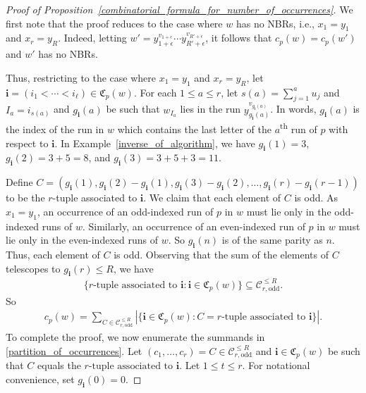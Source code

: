 \documentclass[11pt]{amsart}
\begin{document}
\begin{proof}[Proof of Proposition~\ref{combinatorial_formula_for_number_of_occurrences}]
    We first note that the proof reduces to the case where $w$ has no NBRs, i.e., $x_1=y_1$ and $x_r=y_R$. Indeed, letting $w'=y_{1+\epsilon}^{v_{1+\epsilon}}\cdots y_{R'+\epsilon}^{v_{R'+\epsilon}}$, it follows that $c_p(w)=c_p(w')$ and $w'$ has no NBRs.
    
    Thus, restricting to the case where $x_1=y_1$ and $x_r=y_R$, let $\mathbf{i}=(i_1<\cdots<i_{\ell})\in\mathfrak{C}_p(w)$. For each $1\leq a\leq r$, let $s(a)=\sum_{j=1}^{a}u_j$ and $I_a=i_{s(a)}$ and $g_{\mathbf{i}}(a)$ be such that $w_{I_a}$ lies in the run $y_{g_{\mathbf{i}}(a)}^{v_{g_{\mathbf{i}}(a)}}$. In words, $g_{\mathbf{i}}(a)$ is the index of the run in $w$ which contains the last letter of the $a$\textsuperscript{th} run of $p$ with respect to $\mathbf{i}$. In Example~\ref{inverse_of_algorithm}, we have $g_{\mathbf{i}}(1)=3$, $g_{\mathbf{i}}(2)=3+5=8$, and $g_{\mathbf{i}}(3)=3+5+3=11$. 
    
    Define $C=(g_{\mathbf{i}}(1),g_{\mathbf{i}}(2)-g_{\mathbf{i}}(1),g_{\mathbf{i}}(3)-g_{\mathbf{i}}(2),\dots,g_{\mathbf{i}}(r)-g_{\mathbf{i}}(r-1))$ to be the $r$-tuple associated to $\mathbf{i}$. We claim that each element of $C$ is odd. As $x_1=y_1$, an occurrence of an odd-indexed run of $p$ in $w$ must lie only in the odd-indexed runs of $w$. Similarly, an occurrence of an even-indexed run of $p$ in $w$ must lie only in the even-indexed runs of $w$. So $g_{\mathbf{i}}(n)$ is of the same parity as $n$. Thus, each element of $C$ is odd. Observing that the sum of the elements of $C$ telescopes to $g_{\mathbf{i}}(r)\leq R$, we have
    \begin{align*}
        \{r\text{-tuple~associated~to~}\mathbf{i}:\mathbf{i}\in\mathfrak{C}_{p}(w)\}\subseteq\mathscr{C}_{r,\text{odd}}^{\leq R}.
    \end{align*}
    So
    \begin{align}\label{partition_of_occurrences}
        c_p(w)=\sum_{C\in\mathscr{C}_{r,\text{odd}}^{\leq R}}\left|\{\mathbf{i}\in\mathfrak{C}_{p}(w):C=r\text{-tuple~associated~to~}\mathbf{i}\}\right|.
    \end{align}
    To complete the proof, we now enumerate the summands in \eqref{partition_of_occurrences}. Let $(c_1,\dots,c_r)=C\in \mathscr{C}_{r,\text{odd}}^{\leq R}$ and $\mathbf{i}\in\mathfrak{C}_{p}(w)$ be such that $C$ equals the $r\text{-tuple associated to }\mathbf{i}$. Let $1\leq t\leq r$. For notational convenience, set $g_{\mathbf{i}}(0)=0$. 
    

\end{proof}
\end{document}
